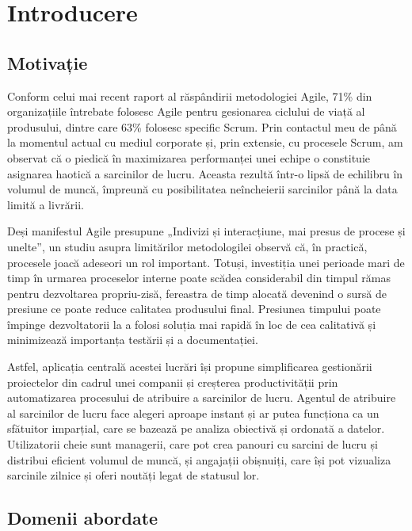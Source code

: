 \chapter{Introducere}

\section{Motivație}

Conform celui mai recent raport al răspândirii metodologiei Agile\cite{annual-state-of-agile-report}, 71\% din organizațiile întrebate folosesc Agile pentru gesionarea ciclului de viață al produsului, dintre care 63\% folosesc specific Scrum. Prin contactul meu de până la momentul actual cu mediul corporate și, prin extensie, cu procesele Scrum, am observat că o piedică în maximizarea performanței unei echipe o constituie asignarea haotică a sarcinilor de lucru. Aceasta rezultă într-o lipsă de echilibru în volumul de muncă, împreună cu posibilitatea neîncheierii sarcinilor până la data limită a livrării.

Deși manifestul Agile\cite{agile-manifesto} presupune „Indivizi și interacțiune, mai presus de procese și unelte”, un studiu asupra limitărilor metodologilei\cite{agile-limitations} observă că, în practică, procesele joacă adeseori un rol important. Totuși, investiția unei perioade mari de timp în urmarea proceselor interne poate scădea considerabil din timpul rămas pentru dezvoltarea propriu-zisă, fereastra de timp alocată devenind o sursă de presiune ce poate reduce calitatea produsului final. Presiunea timpului poate împinge dezvoltatorii la a folosi soluția mai rapidă în loc de cea calitativă și minimizează importanța testării și a documentației.

Astfel, aplicația centrală acestei lucrări își propune simplificarea gestionării proiectelor din cadrul unei companii și creșterea productivității prin automatizarea procesului de atribuire a sarcinilor de lucru. Agentul de atribuire al sarcinilor de lucru face alegeri aproape instant și ar putea funcționa ca un sfătuitor imparțial, care se bazează pe analiza obiectivă și ordonată a datelor. Utilizatorii cheie sunt managerii, care pot crea panouri cu sarcini de lucru și distribui eficient volumul de muncă, și angajații obișnuiți, care își pot vizualiza sarcinile zilnice și oferi noutăți legat de statusul lor.

\section{Domenii abordate}

